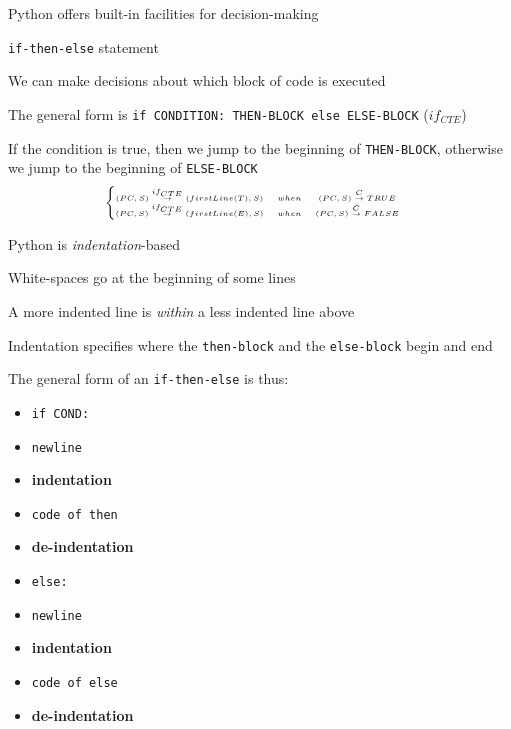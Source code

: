 \documentclass{beamer}
\begin{document}
\begin{slide}{
\item Python offers built-in facilities for decision-making
\item \texttt{if-then-else} statement
\item We can make decisions about which block of code is executed
}\end{slide}

\begin{slide}{
\item The general form is \texttt{if CONDITION: THEN-BLOCK else ELSE-BLOCK} ($if_{CTE}$)
\item If the condition is true, then we jump to the beginning of \texttt{THEN-BLOCK}, otherwise we jump to the beginning of \texttt{ELSE-BLOCK}
$$
\tiny
\left\{
\begin{matrix}
(PC,S) \overset{if_{CTE}}{\rightarrow} (firstLine(T),S) &when& (PC,S) \overset{C}{\rightarrow} TRUE & \\
(PC,S) \overset{if_{CTE}}{\rightarrow} (firstLine(E),S) &when& (PC,S) \overset{C}{\rightarrow} FALSE & \\
\end{matrix}
\right.
$$
}\end{slide}

\begin{slide}{
\item Python is \textit{indentation}-based
\item White-spaces go at the beginning of some lines
\item A more indented line is \textit{within} a less indented line above
}\end{slide}

\begin{slide}{
\item Indentation specifies where the \texttt{then-block} and the \texttt{else-block} begin and end
\item The general form of an \texttt{if-then-else} is thus:
\begin{itemize}
\item \texttt{if COND:}
\item \texttt{newline}
\item \textbf{indentation}
\item \texttt{code of then}
\item \textbf{de-indentation}
\item \texttt{else:}
\item \texttt{newline}
\item \textbf{indentation}
\item \texttt{code of else}
\item \textbf{de-indentation}
\end{itemize}
}\end{slide}
\end{document}
